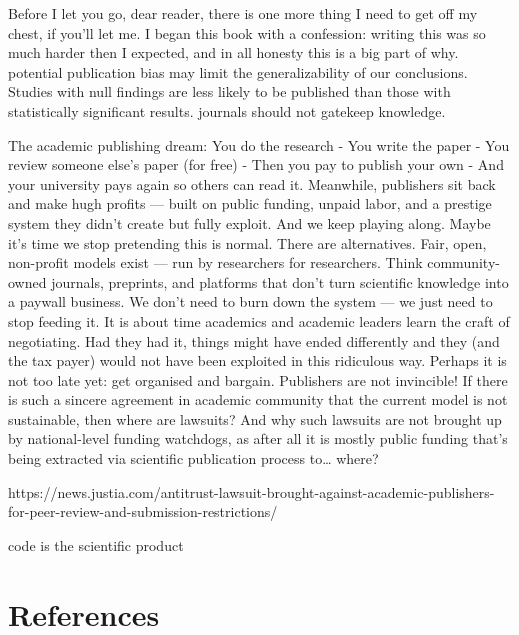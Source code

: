 \documentclass[
  letterpaper,
  DIV=11,
  numbers=noendperiod]{scrreport}
\begin{document}
Before I let you go, dear reader, there is one more thing I need to get
off my chest, if you'll let me. I began this book with a confession:
writing this was so much harder then I expected, and in all honesty this
is a big part of why. potential publication bias may limit the
generalizability of our conclusions. Studies with null findings are less
likely to be published than those with statistically significant
results. journals should not gatekeep knowledge.

The academic publishing dream: You do the research - You write the paper
- You review someone else's paper (for free) - Then you pay to publish
your own - And your university pays again so others can read it.
Meanwhile, publishers sit back and make hugh profits --- built on public
funding, unpaid labor, and a prestige system they didn't create but
fully exploit. And we keep playing along. Maybe it's time we stop
pretending this is normal. There are alternatives. Fair, open,
non-profit models exist --- run by researchers for researchers. Think
community-owned journals, preprints, and platforms that don't turn
scientific knowledge into a paywall business. We don't need to burn down
the system --- we just need to stop feeding it. It is about time
academics and academic leaders learn the craft of negotiating. Had they
had it, things might have ended differently and they (and the tax payer)
would not have been exploited in this ridiculous way. Perhaps it is not
too late yet: get organised and bargain. Publishers are not invincible!
If there is such a sincere agreement in academic community that the
current model is not sustainable, then where are lawsuits? And why such
lawsuits are not brought up by national-level funding watchdogs, as
after all it is mostly public funding that's being extracted via
scientific publication process to\ldots{} where?

https://news.justia.com/antitrust-lawsuit-brought-against-academic-publishers-for-peer-review-and-submission-restrictions/

code is the scientific product

\section*{References}\label{references-7}

\end{document}

